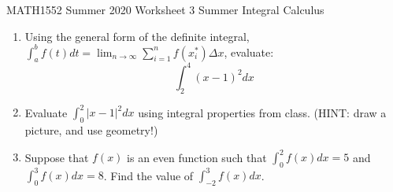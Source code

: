\documentclass[12pt]{article}
\begin{document}
\noindent
MATH1552 Summer 2020
\hspace{2.2cm}
Worksheet 3 Summer
\hspace{2cm} Integral Calculus

\vspace{2mm}


\begin{enumerate}
 \item  Using the general form of the definite integral, $\int_{a}^b f(t)dt = \lim_{n\rightarrow \infty}\sum_{i=1}^n f(x_i^*)\Delta x$, evaluate:
$$\int_{2}^4 (x-1)^2dx$$





\item Evaluate $\int_0^2 |x-1|^2dx$  using integral properties from class. (HINT: draw a picture, and
use geometry!)

\item Suppose that $f(x)$ is an even function such that $\int_0^2 f(x)dx =5$ and $\int_0^3 f(x)dx=8$. Find the value of $\int_{-2}^3f(x)dx$.

\end{enumerate}
\end{document}
